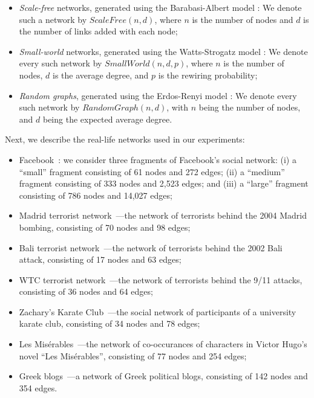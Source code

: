 \documentclass[twocolumn]{article}
\begin{document}
\begin{itemize}[leftmargin=*]
\item \emph{Scale-free} networks, generated using the Barabasi-Albert model \cite{barabasi1999emergence}: We denote such a network by $\mathit{ScaleFree}(n,d)$, where $n$ is the number of nodes and $d$ is the number of links added with each node;
%
\item \emph{Small-world} networks, generated using the Watts-Strogatz model \cite{watts1998collective}: We denote every such network by $\mathit{SmallWorld}(n,d,p)$, where $n$ is the number of nodes, $d$ is the average degree, and $p$ is the rewiring probability;
%
\item \emph{Random graphs}, generated using the Erdos-Renyi model \cite{erdds1959random}: We denote every such network by $\mathit{RandomGraph}(n,d)$, with $n$ being the number of nodes, and $d$ being the expected average degree.
\end{itemize}

\noindent Next, we describe the real-life networks used in our experiments:

\begin{itemize}[leftmargin=*]
\item Facebook~\cite{leskovec2012learning}: we consider three fragments of Facebook's social network: (i) a ``small'' fragment consisting of 61 nodes and 272 edges; (ii) a ``medium'' fragment consisting of 333 nodes and 2,523 edges; and (iii) a ``large'' fragment consisting of 786 nodes and 14,027 edges;
%
\item Madrid terrorist network~\cite{hayes2006connecting}---the network of terrorists behind the 2004 Madrid bombing, consisting of 70 nodes and 98 edges;
%
\item Bali terrorist network~\cite{hayes2006connecting}---the network of terrorists behind the 2002 Bali attack, consisting of 17 nodes and 63 edges;
\item WTC terrorist network~\cite{krebs2002mapping}---the network of terrorists behind the 9/11 attacks, consisting of 36 nodes and 64 edges;
%
\item Zachary's Karate Club~\cite{zachary1977information}---the social network of participants of a university karate club, consisting of 34 nodes and 78 edges;
%
\item Les Mis\'erables~\cite{knuth1993stanford}---the network of co-occurances of characters in Victor Hugo's novel ``Les Mis\'erables'', consisting of 77 nodes and 254 edges;
%
\item Greek blogs~\cite{zafiropoulos2012connectivity}---a network of Greek political blogs, consisting of 142 nodes and 354 edges.
\end{itemize}
\end{document}
